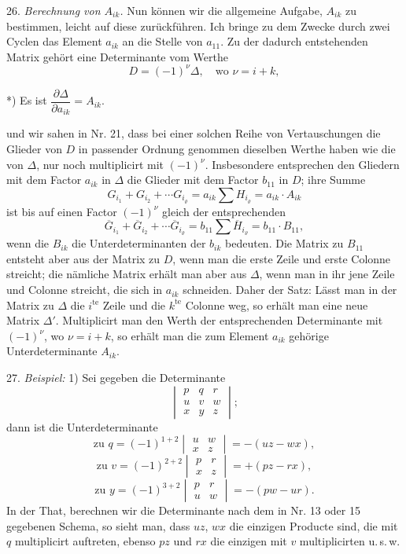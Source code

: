 26. \textit{Berechnung von $A_{ik}$.} Nun k\"onnen wir die allgemeine Aufgabe,
$A_{ik}$ zu bestimmen, leicht auf diese zur\"uckf\"uhren. Ich bringe zu dem
Zwecke durch zwei Cyclen das Element $a_{ik}$ an die Stelle von $a_{11}$. Zu
der dadurch entstehenden Matrix geh\"ort eine Determinante vom Werthe
\[
D = (-1)^{\nu}\Delta, \quad \text{wo } \nu = i + k,
\]

*) Es ist $\dfrac{\partial \Delta}{\partial a_{ik}} = A_{ik}$.



und wir sahen in Nr. 21, dass bei einer solchen Reihe von Vertauschungen die
Glieder von $D$ in passender Ordnung genommen dieselben Werthe haben wie die
von $\Delta$, nur noch multiplicirt mit $(-1)^\nu$. Insbesondere entsprechen
den Gliedern mit dem Factor $a_{ik}$ in $\Delta$ die Glieder mit dem Factor
$b_{11}$ in $D$; ihre Summe
\[
G_{i_1}+G_{i_2}+\cdots G_{i_\varrho}=a_{ik}\sum H_{i_\varrho}=a_{ik}\cdot A_{ik}
\]
ist bis auf einen Factor $(-1)^\nu$ gleich der entsprechenden
\[
\overline{G}_{i_1}+\overline{G}_{i_2}+\cdots \overline{G}_{i_\varrho}=b_{11}\sum \overline{H}_{i_\varrho}=b_{11}\cdot B_{11},
\]
wenn die $B_{ik}$ die Unterdeterminanten der $b_{ik}$ bedeuten. Die Matrix zu
$B_{11}$ entsteht aber aus der Matrix zu $D$, wenn man die erste Zeile und
erste Colonne streicht; die nämliche Matrix erhält man aber aus $\Delta$,
wenn man in ihr jene Zeile und Colonne streicht, die sich in $a_{ik}$
schneiden. Daher der Satz: \glqq Lässt man in der Matrix zu $\Delta$ die
$i^{\text{te}}$ Zeile und die $k^{\text{te}}$ Colonne weg, so erhält man eine
neue Matrix $\Delta'$. Multiplicirt man den Werth der entsprechenden
Determinante mit $(-1)^\nu$, wo $\nu=i+k$, so erhält man die zum Element
$a_{ik}$ gehörige Unterdeterminante $A_{ik}$.\grqq{}

27. \textit{Beispiel:} 1) Sei gegeben die Determinante
\[
\begin{vmatrix} p & q & r \\ u & v & w \\ x & y & z \end{vmatrix};
\]
dann ist die Unterdeterminante
\[
\text{zu } q=(-1)^{1+2}\begin{vmatrix} u & w \\ x & z \end{vmatrix}=-(uz-wx),
\]
\[
\text{zu } v=(-1)^{2+2}\begin{vmatrix} p & r \\ x & z \end{vmatrix}=+(pz-rx),
\]
\[
\text{zu } y=(-1)^{3+2}\begin{vmatrix} p & r \\ u & w \end{vmatrix}=-(pw-ur).
\]
In der That, berechnen wir die Determinante nach dem in Nr. 13 oder 15
gegebenen Schema, so sieht man, dass $uz$, $wx$ die einzigen Producte sind,
die mit $q$ multiplicirt auftreten, ebenso $pz$ und $rx$ die einzigen mit $v$
multiplicirten u.\,s.\,w.

